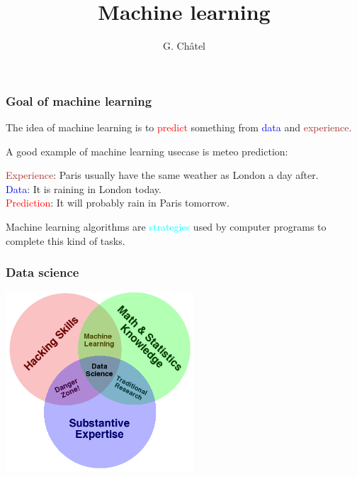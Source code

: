 \documentclass[9pt]{beamer}
\title{Machine learning}
\author{G. Châtel}
\date{}
\begin{document}
\begin{frame}

  \maketitle

\end{frame}

\begin{frame}
  \frametitle{Goal of machine learning}


  The idea of machine learning is to \textcolor{red}{predict}
  something from \textcolor{blue}{data} and
  \textcolor{brown}{experience}.

  \bigskip

  A good example of machine learning usecase is meteo prediction:

  \textcolor{brown}{Experience}: Paris usually have the same weather
  as London a day after.\\
  \textcolor{blue}{Data}: It is raining in London today.\\
  \textcolor{red}{Prediction}: It will probably rain in Paris tomorrow.

  \bigskip

  Machine learning algorithms are \textcolor{cyan}{strategies} used by
  computer programs to complete this kind of tasks.
\end{frame}

\begin{frame}
  \frametitle{Data science}

  \begin{center}
    \includegraphics[width = 7cm]{images/data_science_venn.png}
  \end{center}

\end{frame}
\end{document}
